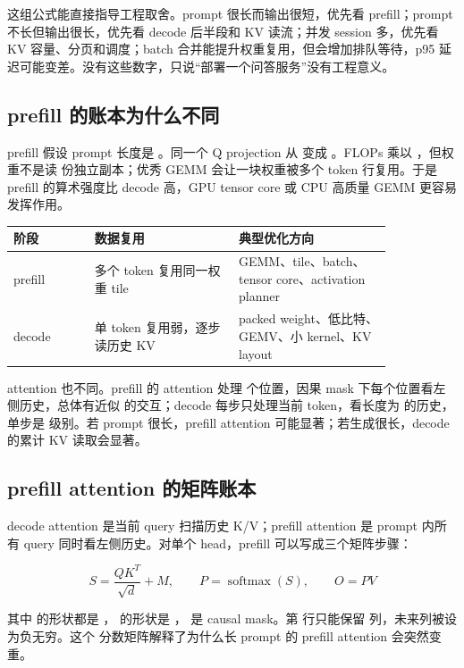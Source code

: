 这组公式能直接指导工程取舍。prompt 很长而输出很短，优先看 prefill；prompt 不长但输出很长，优先看 decode 后半段和 KV 读流；并发 session 多，优先看 KV 容量、分页和调度；batch 合并能提升权重复用，但会增加排队等待，p95 延迟可能变差。没有这些数字，只说“部署一个问答服务”没有工程意义。

\subsection{prefill 的账本为什么不同}

prefill 假设 prompt 长度是 。同一个 Q projection 从 \code{[1,H] * [H,H]} 变成 \code{[T,H] * [H,H]}。FLOPs 乘以 ，但权重不是读  份独立副本；优秀 GEMM 会让一块权重被多个 token 行复用。于是 prefill 的算术强度比 decode 高，GPU tensor core 或 CPU 高质量 GEMM 更容易发挥作用。

\begin{center}
\begin{tabular}{p{0.18\linewidth}p{0.32\linewidth}p{0.34\linewidth}}
\toprule
阶段 & 数据复用 & 典型优化方向 \\
\midrule
prefill & 多个 token 复用同一权重 tile & GEMM、tile、batch、tensor core、activation planner \\
decode & 单 token 复用弱，逐步读历史 KV & packed weight、低比特、GEMV、小 kernel、KV layout \\
\bottomrule
\end{tabular}
\end{center}

attention 也不同。prefill 的 attention 处理  个位置，因果 mask 下每个位置看左侧历史，总体有近似  的交互；decode 每步只处理当前 token，看长度为  的历史，单步是  级别。若 prompt 很长，prefill attention 可能显著；若生成很长，decode 的累计 KV 读取会显著。

\subsection{prefill attention 的矩阵账本}

decode attention 是当前 query 扫描历史 K/V；prefill attention 是 prompt 内所有 query 同时看左侧历史。对单个 head，prefill 可以写成三个矩阵步骤：

\[
S = \frac{QK^T}{\sqrt{d}} + M,\qquad
P = \operatorname{softmax}(S),\qquad
O = PV
\]

其中  的形状都是 \code{[T,d]}， 的形状是 \code{[T,T]}， 是 causal mask。第  行只能保留  列，未来列被设为负无穷。这个 \code{[T,T]} 分数矩阵解释了为什么长 prompt 的 prefill attention 会突然变重。

